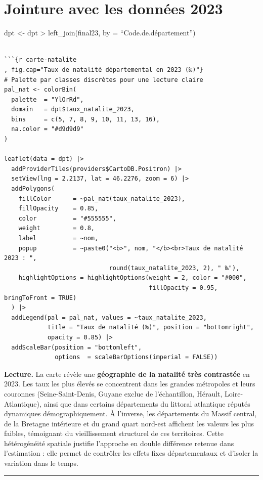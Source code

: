 \documentclass[
  letterpaper,
  DIV=11,
  numbers=noendperiod]{scrartcl}
\begin{document}
\section{Jointure avec les données
2023}\label{jointure-avec-les-donnuxe9es-2023}

dpt \textless- dpt \textbar\textgreater{} left\_join(final23, by =
``Code.de.département'')

\begin{verbatim}

```{r carte-natalite
, fig.cap="Taux de natalité départemental en 2023 (‰)"}
# Palette par classes discrètes pour une lecture claire
pal_nat <- colorBin(
  palette  = "YlOrRd",
  domain   = dpt$taux_natalite_2023,
  bins     = c(5, 7, 8, 9, 10, 11, 13, 16),
  na.color = "#d9d9d9"
)

leaflet(data = dpt) |>
  addProviderTiles(providers$CartoDB.Positron) |>
  setView(lng = 2.2137, lat = 46.2276, zoom = 6) |>
  addPolygons(
    fillColor      = ~pal_nat(taux_natalite_2023),
    fillOpacity    = 0.85,
    color          = "#555555",
    weight         = 0.8,
    label          = ~nom,
    popup          = ~paste0("<b>", nom, "</b><br>Taux de natalité 2023 : ",
                             round(taux_natalite_2023, 2), " ‰"),
    highlightOptions = highlightOptions(weight = 2, color = "#000",
                                        fillOpacity = 0.95, bringToFront = TRUE)
  ) |>
  addLegend(pal = pal_nat, values = ~taux_natalite_2023,
            title = "Taux de natalité (‰)", position = "bottomright",
            opacity = 0.85) |>
  addScaleBar(position = "bottomleft",
              options  = scaleBarOptions(imperial = FALSE))
\end{verbatim}

\textbf{Lecture.} La carte révèle une \textbf{géographie de la natalité
très contrastée} en 2023. Les taux les plus élevés se concentrent dans
les grandes métropoles et leurs couronnes (Seine-Saint-Denis, Guyane
exclue de l'échantillon, Hérault, Loire-Atlantique), ainsi que dans
certains départements du littoral atlantique réputés dynamiques
démographiquement. À l'inverse, les départements du Massif central, de
la Bretagne intérieure et du grand quart nord-est affichent les valeurs
les plus faibles, témoignant du vieillissement structurel de ces
territoires. Cette hétérogénéité spatiale justifie l'approche en double
différence retenue dans l'estimation : elle permet de contrôler les
effets fixes départementaux et d'isoler la variation dans le temps.

\begin{center}\rule{0.5\linewidth}{0.5pt}\end{center}
\end{document}
